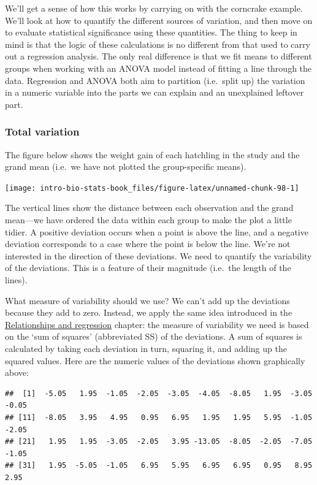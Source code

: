 \documentclass[
]{book}
\begin{document}
We'll get a sense of how this works by carrying on with the corncrake example. We'll look at how to quantify the different sources of variation, and then move on to evaluate statistical significance using these quantities. The thing to keep in mind is that the logic of these calculations is no different from that used to carry out a regression analysis. The only real difference is that we fit means to different groups when working with an ANOVA model instead of fitting a line through the data. Regression and ANOVA both aim to partition (i.e.~split up) the variation in a numeric variable into the parts we can explain and an unexplained leftover part.

\hypertarget{total-variation-1}{%
\subsubsection*{Total variation}\label{total-variation-1}}

The figure below shows the weight gain of each hatchling in the study and the grand mean (i.e.~we have not plotted the group-specific means).

\begin{center}\texttt{[image: intro-bio-stats-book\_files/figure-latex/unnamed-chunk-98-1]} \end{center}

The vertical lines show the distance between each observation and the grand mean---we have ordered the data within each group to make the plot a little tidier. A positive deviation occurs when a point is above the line, and a negative deviation corresponds to a case where the point is below the line. We're not interested in the direction of these deviations. We need to quantify the variability of the deviations. This is a feature of their magnitude (i.e.~the length of the lines).

What measure of variability should we use? We can't add up the deviations because they add to zero. Instead, we apply the same idea introduced in the \protect\hyperlink{relationships-and-regression}{Relationships and regression} chapter: the measure of variability we need is based on the `sum of squares' (abbreviated SS) of the deviations. A sum of squares is calculated by taking each deviation in turn, squaring it, and adding up the squared values. Here are the numeric values of the deviations shown graphically above:

\begin{verbatim}
##  [1]  -5.05   1.95  -1.05  -2.05  -3.05  -4.05  -8.05   1.95  -3.05  -0.05
## [11]  -8.05   3.95   4.95   0.95   6.95   1.95   1.95   5.95  -1.05  -2.05
## [21]   1.95   1.95  -3.05  -2.05   3.95 -13.05  -8.05  -2.05  -7.05  -1.05
## [31]   1.95  -5.05  -1.05   6.95   5.95   6.95   6.95   0.95   8.95   2.95
\end{verbatim}
\end{document}
